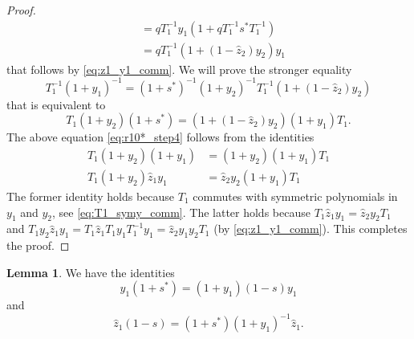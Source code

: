 \documentclass[reqno]{amsart}
\theoremstyle{plain}
\theoremstyle{definition}
\newtheorem{lemma}[theorem]{Lemma}
\theoremstyle{remark}
\newcommand{\z}{\widehat{z}}
\newcommand{\<}{\langle}
\renewcommand{\>}{\rangle}
\begin{document}
\begin{proof}
\begin{align*}
        &=  q
        T_1^{-1} y_1 \left( 1 + qT_1^{-1} s^* T_1^{-1} \right)\\
        &=  q
        T_1^{-1}  \left( 1 + (1 - \z_2) y_2 \right) y_1 
    \end{align*}
    that follows by \eqref{eq:z1_y1_comm}.
    We will prove the stronger equality
    \[ T_1^{-1} (1 + y_1)^{-1} =  (1+s^*)^{-1}  (1 + y_2)^{-1} T_1^{-1}  \left( 1 + (1 - \z_2) y_2 \right) \]
    that is equivalent to
    \begin{equation}
        \label{eq:r10*_step4}
        T_1 (1 + y_2) (1+s^*) = \left( 1 + (1 - \z_2) y_2 \right) (1 + y_1) T_1.
    \end{equation}
    The above equation \eqref{eq:r10*_step4} follows from the identities
    \begin{align}
        T_1 (1 + y_2) (1 + y_1) &= (1 + y_2) (1 + y_1) T_1 \\
        T_1 (1 + y_2) \z_1 y_1 &= \z_2 y_2 (1 + y_1) T_1
    \end{align}
    The former identity holds because $T_1$ commutes with symmetric polynomials in $y_1$ and $y_2$, see \eqref{eq:T1_symy_comm}.
    The latter holds because $T_1 \z_1 y_1 = \z_2 y_2 T_1$ and $T_1 y_2 \z_1 y_1 = T_1 \z_1 T_1 y_1 T_1^{-1} y_1 = \z_2 y_1 y_2 T_1$ (by \eqref{eq:z1_y1_comm}).
    This completes the proof.
\end{proof}

\begin{lemma}
    \label{lem:theta_q2}
    We have the identities
    \begin{equation}
        \label{eq:y1(1+s*)}
        y_1 (1 + s^*) = (1 + y_1) (1-s) y_1
    \end{equation}
    and
    \begin{equation}
        \label{eq:z1(1-s)}
        \z_1 (1-s) = (1 + s^*) (1 + y_1)^{-1} \z_1.
    \end{equation}
\end{lemma}
\end{document}
